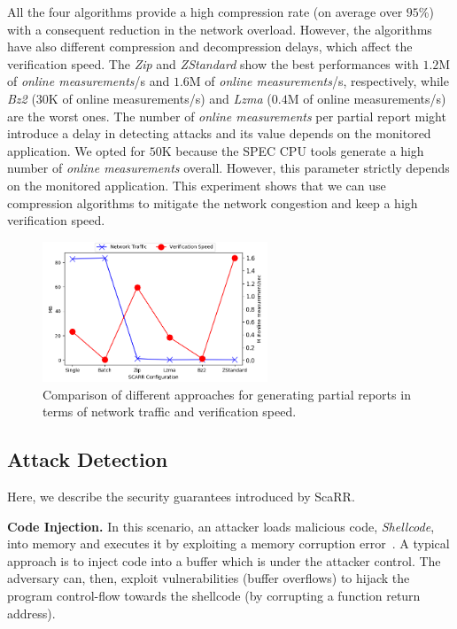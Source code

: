 All the four algorithms provide a high compression rate (on average over 
$95$\%) with a consequent reduction in the network overload.
However, the algorithms have also different compression and decompression 
delays, which affect the verification speed.
The \emph{Zip} and \emph{ZStandard} show the best performances with $1.2$M of 
\emph{online measurements}/s and $1.6$M of \emph{online measurements}/s, 
respectively, while \emph{Bz2} ($30$K of online measurements/s) and \emph{Lzma} 
($0.4$M of online measurements/s) are the worst ones. 
The number of \emph{online measurements} per partial report might introduce a 
delay in
detecting attacks and its value depends on the monitored application.
We opted for $50$K because the SPEC CPU tools generate a high number of 
\emph{online measurements} overall.
However, this parameter strictly depends on the monitored application.
This experiment shows that we can use compression algorithms to mitigate the 
network congestion and keep a high verification speed.

\begin{figure}[t]
	\centering
	\includegraphics[width=0.6\textwidth]{fig_c4/network_performance.png}
	\caption[ScaRR network traffic evaluation.]{Comparison of different 
	approaches for generating partial reports in terms of network traffic and 
	verification speed.}
	\label{fig:network_performance}
\end{figure} 

\subsection{Attack Detection}
\label{ssec:security+privacy+consideration}
Here, we describe the security guarantees introduced by ScaRR. 

\textbf{Code Injection.}
In this scenario, an attacker loads malicious code, \eg \emph{Shellcode}, into 
memory and executes it by exploiting a memory corruption 
error~\citep{smith1997stack}.
A typical approach is to inject code into a buffer which is under the attacker 
control.
The adversary can, then, exploit vulnerabilities (\eg buffer overflows) to 
hijack the program control-flow towards the shellcode (\eg by corrupting a 
function return address).

